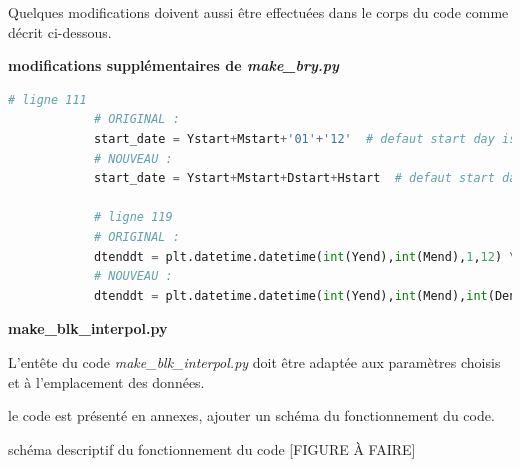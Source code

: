 \documentclass[10pt,a4paper,titlepage]{article}
\begin{document}
    Quelques modifications doivent aussi être effectuées dans le corps du code comme décrit ci-dessous.
    
    \begin{codeEnv}{\textbf{modifications supplémentaires de \textit{make\_bry.py}}}
        \begin{lstlisting}[language=python]
            # ligne 111
            # ORIGINAL :
            start_date = Ystart+Mstart+'01'+'12'  # defaut start day is 1st
            # NOUVEAU :
            start_date = Ystart+Mstart+Dstart+Hstart  # defaut start day is 1st
            
            # ligne 119
            # ORIGINAL :
            dtenddt = plt.datetime.datetime(int(Yend),int(Mend),1,12) \
            # NOUVEAU :
            dtenddt = plt.datetime.datetime(int(Yend),int(Mend),int(Dend),int(Hend)) \
        \end{lstlisting}
    \end{codeEnv}
    
    
    \textbf{make\_blk\_interpol.py}
    
    L'entête du code \textit{make\_blk\_interpol.py} doit être adaptée aux paramètres choisis et à l'emplacement des données.
    
    le code est présenté en annexes, ajouter un schéma du fonctionnement du code.
    
    schéma descriptif du fonctionnement du code [FIGURE À FAIRE]
    
\end{document}
